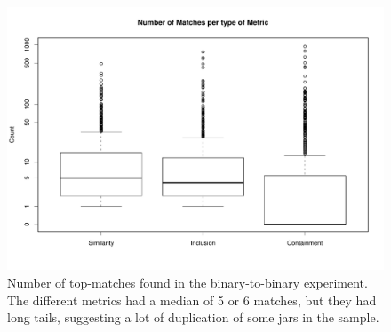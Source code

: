 
\begin{figure}[h]
  \centering
\includegraphics[width=\columnwidth]{plots/boxplotPerfectMatches.pdf}
\vspace{-7mm}
  \caption{Number of top-matches found in the binary-to-binary
    experiment. The different metrics had a median of 5 or 6 matches,
    but they had long tails, suggesting a lot of duplication of some
    jars in the sample. }
  \label{fig:topMatchesSource}
\end{figure}


